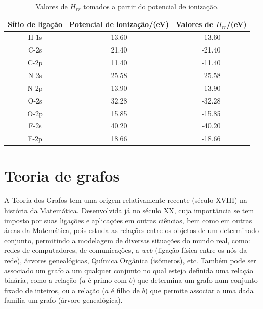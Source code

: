 \begin{table}[htb]
	\centering
	\caption{\label{qua:Quadro_1} Valores de $H_{rr}$ tomados a partir do potencial de ionização.}	
	\begin{tabular}{ccc}
		\toprule
		\textbf{Sítio de ligação} & \textbf{Potencial de ionização/(eV)} & \textbf{Valores de $H_{rr}$/(eV)}
		\\ 
		\midrule
        H-1s & 13.60 & -13.60 \\
        C-2s & 21.40 & -21.40 \\
        C-2p & 11.40 & -11.40 \\
        N-2s & 25.58 & -25.58 \\
        N-2p & 13.90 & -13.90 \\
        O-2s & 32.28 & -32.28 \\
        O-2p & 15.85 & -15.85 \\
        F-2s & 40.20 & -40.20 \\
        F-2p & 18.66 & -18.66 \\
    \bottomrule
	\end{tabular}
\end{table}




\chapter{Teoria de grafos} \label{ap:graph}

A Teoria dos Grafos tem uma origem relativamente recente (século XVIII) na
história da Matemática. Desenvolvida já no século XX, cuja importância se tem
imposto por suas ligações e aplicações em outras ciências, bem como em outras
áreas da Matemática, pois estuda as relações entre os objetos de um determinado conjunto\autocite{neto2016topicos, soares2014introduccao}, permitindo a modelagem de diversas situações do mundo real, como: redes de computadores, de comunicações, a \textit{web} (ligação física entre
os nós da rede), árvores genealógicas, Química Orgânica (isômeros), etc. Também pode ser associado um grafo
a um qualquer conjunto no qual esteja definida uma relação binária, como a relação
($a$ é primo com $b$) que determina um grafo num conjunto fixado de inteiros, ou a
relação ($a$ é filho de $b$) que permite associar a uma dada família um grafo (árvore
genealógica).


